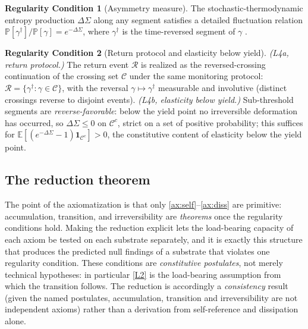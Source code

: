 \documentclass[11pt]{article}
\theoremstyle{plain}
\theoremstyle{definition}
\newtheorem{regularity}{Regularity Condition}
\theoremstyle{remark}
\newcommand{\E}{\mathbb{E}}
\begin{document}
\begin{regularity}[Asymmetry measure]\label{L3}
The stochastic-thermodynamic entropy production $\Delta\Sigma$ along any segment satisfies a detailed fluctuation relation $\mathbb P[\gamma^{\dagger}]/\mathbb P[\gamma]=e^{-\Delta\Sigma}$, where $\gamma^{\dagger}$ is the time-reversed segment of $\gamma$ \citep{crooks1999,seifert2012}.
\end{regularity}

\begin{regularity}[Return protocol and elasticity below yield]\label{L4}
\emph{(L4a, return protocol.)} The return event $\mathcal R$ is realized as the reversed-crossing continuation of the crossing set $\mathcal C$ under the same monitoring protocol: $\mathcal R=\{\gamma^\dagger:\gamma\in\mathcal C\}$, with the reversal $\gamma\mapsto\gamma^\dagger$ measurable and involutive (distinct crossings reverse to disjoint events). \emph{(L4b, elasticity below yield.)} Sub-threshold segments are \emph{reverse-favorable}: below the yield point no irreversible deformation has occurred, so $\Delta\Sigma\le0$ on $\mathcal C^c$, strict on a set of positive probability; this suffices for $\E[(e^{-\Delta\Sigma}-1)\mathbf 1_{\mathcal C^c}]>0$, the constitutive content of elasticity below the yield point.
\end{regularity}

\subsection{The reduction theorem}

The point of the axiomatization is that only \ref{ax:self}--\ref{ax:diss} are primitive: accumulation, transition, and irreversibility are \emph{theorems} once the regularity conditions hold. Making the reduction explicit lets the load-bearing capacity of each axiom be tested on each substrate separately, and it is exactly this structure that produces the predicted null findings of a substrate that violates one regularity condition. These conditions are \emph{constitutive postulates}, not merely technical hypotheses: in particular \ref{L2} is the load-bearing assumption from which the transition follows. The reduction is accordingly a \emph{consistency} result (given the named postulates, accumulation, transition and irreversibility are not independent axioms) rather than a derivation from self-reference and dissipation alone.
\end{document}
